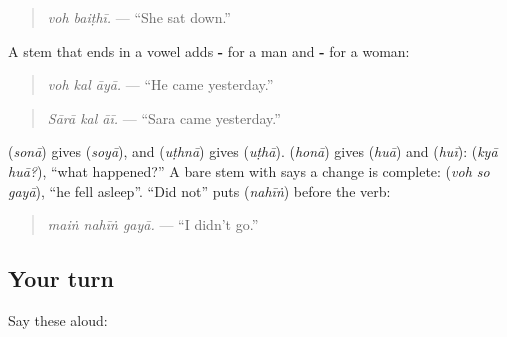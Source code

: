 \begin{quote}
\textbf{ }
\end{quote}

\begin{quote}
\emph{voh baiṭhī.} — \textquotedblleft{}She sat down.\textquotedblright{}
\end{quote}

A stem that ends in a vowel adds \textbf{-} for a man and \textbf{-} for a woman:

\begin{quote}
\textbf{  }
\end{quote}

\begin{quote}
\emph{voh kal āyā.} — \textquotedblleft{}He came yesterday.\textquotedblright{}
\end{quote}

\begin{quote}
\textbf{  }
\end{quote}

\begin{quote}
\emph{Sārā kal āī.} — \textquotedblleft{}Sara came yesterday.\textquotedblright{}
\end{quote}

\textbf{} (\emph{sonā}) gives \textbf{} (\emph{soyā}), and \textbf{} (\emph{uṭhnā}) gives \textbf{} (\emph{uṭhā}). \textbf{} (\emph{honā}) gives \textbf{} (\emph{huā}) and \textbf{} (\emph{huī}): \textbf{ } (\emph{kyā huā?}), \textquotedblleft{}what happened?\textquotedblright{} A bare stem with \textbf{} says a change is complete: \textbf{  } (\emph{voh so gayā}), \textquotedblleft{}he fell asleep\textquotedblright{}. \textquotedblleft{}Did not\textquotedblright{} puts \textbf{} (\emph{nahīṅ}) before the verb:

\begin{quote}
\textbf{  }
\end{quote}

\begin{quote}
\emph{maiṅ nahīṅ gayā.} — \textquotedblleft{}I didn't go.\textquotedblright{}
\end{quote}

\subsection*{Your turn}
Say these aloud:

